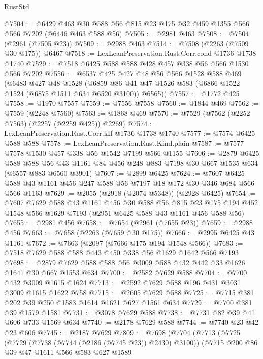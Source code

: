 \begin{lexlean}{RustStd}
\begin{coremodule}
{\begin{coremodule}
{{{{{{{{{{{{{{{@7504 := @6429 @463 @30 @588 @56 @815 @23 @175 @32 @459 @1355 @566 @566 @7202 (@6446 @463 @588 @56)
@7505 := @2981 @463
@7508 := @7504 (@2961 (@7505 @23))
@7509 := @2988 @463
@7514 := @7508 (@2263 (@7509 @30 @175)) @6467
@7518 := LexLeanPreservation.Rust.Corr.cond @1736 @1738 @1740
@7529 := @7518 @6425 @588 @588 @428 @457 @338 @56 @566 @1530 @566 @7202
@7556 := @6537
    @425
    @427
    @48
    @56
    @566
    @1528
    @588
    @469
    (@6483
      @427
      @48
      @1528
      (@6859 @86 @41 @47 @1526 @583 (@6866 @1522 @1524 (@6875 @1511 @634 @6520 @3100)) @6565))
@7557 := @1772 @425
@7558 := @1970 @7557
@7559 := @7556 @7558
@7560 := @1844 @469
@7562 := @7559 (@2248 @7560)
@7563 := @1868 @469
@7570 := @7529 (@7562 (@2252 @7563) (@2257 (@2259 @425)) @2269)
@7574 := LexLeanPreservation.Rust.Corr.kIf @1736 @1738 @1740
@7577 := @7574 @6425 @588 @588
@7578 := LexLeanPreservation.Rust.Kind.plain
@7587 := @7577 @7578 @1530 @457 @338 @56 @1542 @7199 @566 @1155
@7606 := @2879
    @6425
    @588
    @588
    @56
    @43
    @1161
    @84
    @456
    @248
    @883
    @7198
    @30
    @667
    @1535
    @634
    (@6557 @883 @6560 @3901)
@7607 := @2899 @6425
@7624 := @7607 @6425 @588 @43 @1161 @456 @247 @588 @56 @7197 @18 @172 @30 @346 @684 @566 @566 @1163
@7629 := @2055 (@2918 (@2074 @5348)) (@2928 @6425)
@7654 := @7607
    @7629
    @588
    @43
    @1161
    @456
    @30
    @588
    @56
    @815
    @23
    @175
    @194
    @452
    @1548
    @566
    @1629
    @7193
    (@2951 @6425 @588 @43 @1161 @456 @588 @56)
@7655 := @2981 @456
@7658 := @7654 (@2961 (@7655 @23))
@7659 := @2988 @456
@7663 := @7658 (@2263 (@7659 @30 @175))
@7666 := @2995 @6425 @43 @1161
@7672 := @7663 (@2097 (@7666 @175 @194 @1548 @566))
@7683 := @7518 @7629 @588 @588 @443 @450 @338 @56 @1629 @1642 @566 @7193
@7698 := @2879 @7629 @588 @588 @56 @3009 @588 @432 @442 @33 @1626 @1641 @30 @667 @1553 @634
@7700 := @2582 @7629 @588
@7704 := @7700 @432 @3009 @1615 @1624
@7713 := @2592 @7629 @588 @196 @431 @3031 @3009 @1615 @1622 @758
@7715 := @2605 @7629 @588
@7725 := @7715 @381 @202 @39 @250 @1583 @1614 @1621 @627 @1561 @634
@7729 := @7700 @381 @39 @1579 @1581
@7731 := @3078 @7629 @588
@7738 := @7731 @82 @39 @41 @606 @733 @1569 @634
@7740 := @2178 @7629 @588
@7744 := @7740 @23 @42 @23 @606
@7745 := @2187 @7629
@7809 := @7698
    (@7704
      (@7713
        (@7725
          (@7729 (@7738 (@7744 (@2186 (@7745 @23)) @2430) @3100))
          (@7715
            @200
            @86
            @39
            @47
            @1611
            @566
            @583
            @627
            @1589
}}}}}}}}}}}}}}}
\end{coremodule}}
\end{coremodule}
\end{lexlean}
